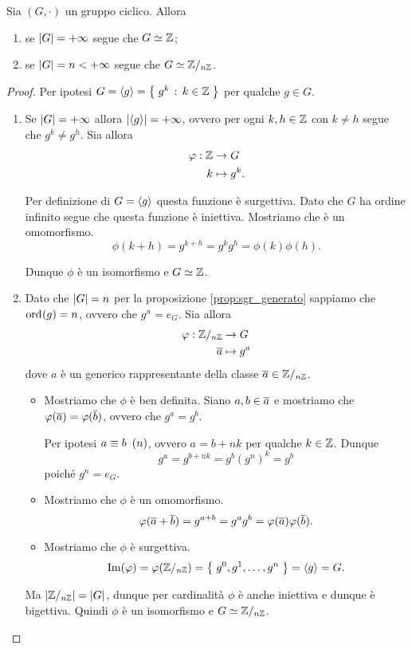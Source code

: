 \begin{theorem}
    \label{th:iso_ciclico}
    Sia $(G, \cdot)$ un gruppo ciclico. Allora \begin{enumerate}[label={(\roman*)}, ref={\thetheorem: (\roman*)}]
        \item se $\abs G = +\infty$ segue che $G \isomorph \Z$;
        \item se $\abs G = n < +\infty$ segue che $G \isomorph \Zmod n$.
    \end{enumerate}
\end{theorem}
\begin{proof}
    Per ipotesi $G = \gen*{g} = \set{g^k \suchthat k \in \Z}$ per qualche $g \in G$.
    \begin{enumerate}[label={(\roman*)}]
        \item Se $\abs G = +\infty$ allora $\abs*{\gen*{g}} = +\infty$, ovvero per ogni $k, h \in \Z$ con $k \neq h$ segue che $g^k \neq g^h$. Sia allora \begin{align*}
            \phi : \Z &\to G\\
            k &\mapsto g^k.
        \end{align*}

        Per definizione di $G = \gen{g}$ questa funzione è surgettiva. Dato che $G$ ha ordine infinito segue che questa funzione è iniettiva. Mostriamo che è un omomorfismo. \[
            \phi(k + h) = g^{k + h} = g^kg^h = \phi(k)\phi(h).    
        \]

        Dunque $\phi$ è un isomorfismo e $G \isomorph \Z$.
        \item Dato che $\abs{G} = n$ per la proposizione \ref{prop:sgr_generato} sappiamo che $\ord g = n$, ovvero che $g^n = e_G$. Sia allora \begin{align*}
            \phi : \Zmod n &\to G\\
            \eqcl a &\mapsto g^a
        \end{align*} dove $a$ è un generico rappresentante della classe $\eqcl a \in \Zmod n$. \begin{itemize}
            \item Mostriamo che $\phi$ è ben definita. Siano $a, b \in \eqcl a$ e mostriamo che $\phi(\eqcl a) = \phi(\eqcl b)$, ovvero che $g^a = g^b$. 
            
            Per ipotesi $a \congr b \Mod{n}$, ovvero $a = b+nk$ per qualche $k \in \Z$. Dunque \[
                g^a = g^{b + nk} = g^b(g^n)^k = g^b    
            \] poiché $g^n = e_G$.
            \item Mostriamo che $\phi$ è un omomorfismo. \[
                \phi(\eqcl a + \eqcl b) = g^{a + b} = g^ag^b = \phi(\eqcl a)\phi(\eqcl b).
            \] \item Mostriamo che $\phi$ è surgettiva. \[
                \Im \phi = \phi(\Zmod n) = \set{g^0, g^1, \dots, g^n} = \gen g = G.    
            \]
        \end{itemize}
        Ma $\abs*{\Zmod n} = \abs*{G}$, dunque per cardinalità $\phi$ è anche iniettiva e dunque è bigettiva. 
        Quindi $\phi$ è un isomorfismo e $G \isomorph \Zmod n$.
    \end{enumerate}
\end{proof}

